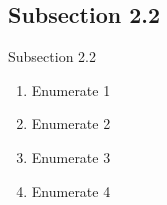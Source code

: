 \documentclass[aspectratio=169]{beamer}
\begin{document}
        \subsection{Subsection 2.2}
            \begin{frame}{Subsection 2.2}
                \begin{enumerate}
                    \item Enumerate 1
                    \item Enumerate 2
                    \item Enumerate 3
                    \item Enumerate 4
                \end{enumerate}
            \end{frame}
\end{document}
